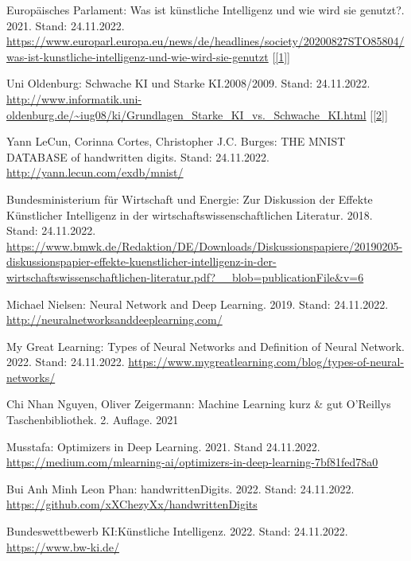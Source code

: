 \documentclass[11pt]{article}
\begin{document}
\newpage
\nolinenumbers{}
{
\renewcommand\refname{Literaturverzeichnis}
\hypersetup{linkcolor=red}
\renewcommand\UrlFont{\color{black}\normalfont}
\begin{thebibliography}{15}

    Europäisches Parlament: Was ist künstliche Intelligenz und wie wird sie genutzt?. 2021. Stand: 24.11.2022.
    \url{https://www.europarl.europa.eu/news/de/headlines/society/20200827STO85804/was-ist-kunstliche-intelligenz-und-wie-wird-sie-genutzt}
    [\ref{1}]
    
    Uni Oldenburg: Schwache KI und Starke KI.\@ 2008/2009. Stand: 24.11.2022.
    \url{http://www.informatik.uni-oldenburg.de/~iug08/ki/Grundlagen_Starke_KI_vs._Schwache_KI.html}
    [\ref{2}]

    Yann LeCun, Corinna Cortes, Christopher J.C. Burges: THE MNIST DATABASE of handwritten digits. Stand: 24.11.2022.
    \url{http://yann.lecun.com/exdb/mnist/}

    Bundesministerium für Wirtschaft und Energie: Zur Diskussion der Effekte Künstlicher Intelligenz in der wirtschaftswissenschaftlichen Literatur. 2018. Stand: 24.11.2022.
    \url{https://www.bmwk.de/Redaktion/DE/Downloads/Diskussionspapiere/20190205-diskussionspapier-effekte-kuenstlicher-intelligenz-in-der-wirtschaftswissenschaftlichen-literatur.pdf?__blob=publicationFile&v=6}

    Michael Nielsen: Neural Network and Deep Learning. 2019. Stand: 24.11.2022.
    \url{http://neuralnetworksanddeeplearning.com/}

    My Great Learning: Types of Neural Networks and Definition of Neural Network. 2022. Stand: 24.11.2022.
    \url{https://www.mygreatlearning.com/blog/types-of-neural-networks/}

    Chi Nhan Nguyen, Oliver Zeigermann: Machine Learning kurz \& gut O’Reillys Taschenbibliothek. 2. Auflage. 2021

    Musstafa: Optimizers in Deep Learning. 2021. Stand 24.11.2022.
    \url{https://medium.com/mlearning-ai/optimizers-in-deep-learning-7bf81fed78a0}

    Bui Anh Minh Leon Phan: handwrittenDigits. 2022. Stand: 24.11.2022.
    \url{https://github.com/xXChezyXx/handwrittenDigits}

    Bundeswettbewerb KI:\@ Künstliche Intelligenz. 2022. Stand: 24.11.2022.
    \url{https://www.bw-ki.de/}

\end{thebibliography}
}
\newpage
\end{document}
